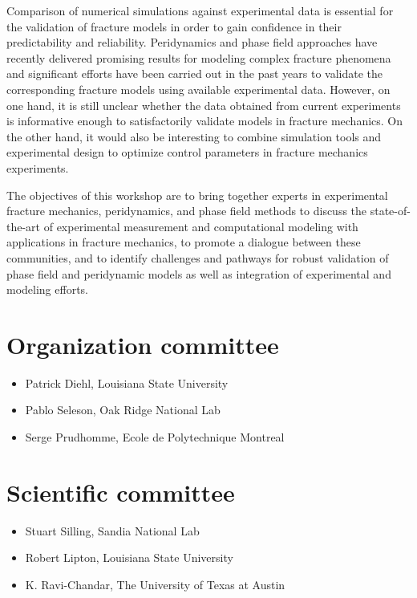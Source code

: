 Comparison of numerical simulations against experimental data is essential
for the validation of fracture models in order to gain confidence in their
predictability and reliability. Peridynamics and phase field approaches have recently
delivered promising results for modeling complex fracture phenomena and significant
efforts have been carried out in the past years to validate the corresponding
fracture models using available experimental data. However, on one hand, it is still
unclear whether the data obtained from current experiments is informative enough to
satisfactorily validate models in fracture mechanics. On the other hand, it would also be
interesting to combine simulation tools and experimental design to optimize
control parameters in fracture mechanics experiments.

The objectives of this workshop are to bring together experts in experimental fracture mechanics,
peridynamics, and phase field methods to discuss the state-of-the-art of experimental
measurement and computational modeling with applications in fracture mechanics, to promote
a dialogue between these communities, and to identify challenges and pathways for robust validation
of phase field and peridynamic models as well as integration of experimental and modeling efforts.

\section*{Organization committee }
\begin{itemize}
\item Patrick Diehl, Louisiana State University
\item Pablo Seleson, Oak Ridge National Lab
\item Serge Prudhomme, Ecole de Polytechnique Montreal
\end{itemize}

\section*{Scientific committee}
\begin{itemize}
\item Stuart Silling, Sandia National Lab
\item Robert Lipton, Louisiana State University
\item K. Ravi-Chandar, The University of Texas at Austin
\end{itemize}
